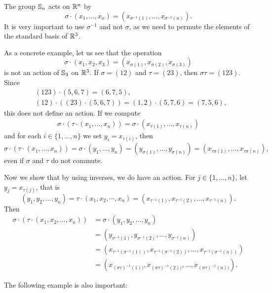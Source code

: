 \begin{example}
    The group $\mathbb{S}_n$ acts on $\mathbb{R}^n$ by
    \[
    \sigma\cdot (x_1,\dots,x_n)=(x_{\sigma^{-1}(1)},\dots,x_{\sigma^{-1}(n)}).
    \]
    It is very important to use $\sigma^{-1}$ and not 
    $\sigma$, as we need to permute the elements of the standard basis of $\mathbb{R}^3$.

    As a concrete example, let us see that the operation 
    \[
    \sigma\cdot (x_1,x_2,x_3)=(x_{\sigma(1)},x_{\sigma(2)},x_{\sigma(3)})
    \]
    is not an action of $\mathbb{S}_3$ on $\mathbb{R}^3$.
    If $\sigma=(12)$ and $\tau=(23)$, then $\sigma\tau=(123)$. Since 
    \begin{align*}
    &(123)\cdot (5,6,7)=(6,7,5),\\
    &(12)\cdot ((23)\cdot (5,6,7))=(1,2)\cdot (5,7,6)=(7,5,6),
    \end{align*}
    this does not define an action. If we compute 
    \begin{align*}
        \sigma\cdot (\tau\cdot (x_1,\dots,x_n))
        =\sigma\cdot (x_{\tau(1)},\dots,x_{\tau(n)})
    \end{align*}
    and for each $i\in\{1,\dots,n\}$ we set $y_i=x_{\tau(i)}$, then 
    \[
    \sigma\cdot (\tau\cdot (x_1,\dots,x_n))=\sigma\cdot (y_1,\dots,y_n)=(y_{\sigma(1)},\dots,y_{\sigma(n)})
    =(x_{\tau\sigma(1)},\dots,x_{\tau\sigma(n)}),
    \]
    even if $\sigma$ and $\tau$ do not commute.

    Now we show that by using inverses, we do have an action. 
    For $j\in\{1,\dots,n\}$, let $y_j=x_{\tau(j)}$,
    that is 
    \[
    (y_1,y_2,\dots,y_n)=\tau\cdot (x_1,x_2,\cdots,x_n)=(x_{\tau^{-1}(1)},x_{\tau^{-1}(2)},\dots,x_{\tau^{-1}(n)}).
    \]
    Then 
    \begin{align*}
        \sigma\cdot (\tau\cdot (x_1,x_2,\dots,x_n))&=\sigma\cdot (y_1,y_2,\dots,y_n)\\
        &=\left(y_{\sigma^{-1}(1)},y_{\sigma^{-1}(2)},\dots,y_{\sigma^{-1}(n)}\right)\\
        &=\left(x_{\tau^{-1}(\sigma^{-1}(1))},x_{\tau^{-1}(\sigma^{-1}(2))},\dots,x_{\tau^{-1}(\sigma
^{-1}(n))}\right)\\
        &=\left(x_{(\sigma\tau)^{-1}(1))},x_{(\sigma\tau)^{-1}(2))},\dots,x_{(\sigma\tau)^{-1}(n))}\right).
    \end{align*}
\end{example}

The following example is also important: 

